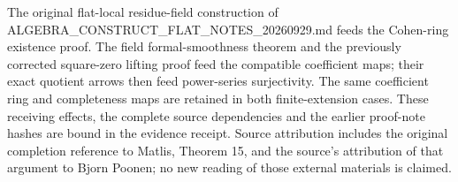 The original flat-local residue-field construction of ALGEBRA\_\allowbreak{}CONSTRUCT\_\allowbreak{}FLAT\_\allowbreak{}NOTES\_\allowbreak{}20260929.\allowbreak{}md feeds the Cohen-ring existence proof. The field formal-smoothness theorem and the previously corrected square-zero lifting proof feed the compatible coefficient maps; their exact quotient arrows then feed power-series surjectivity. The same coefficient ring and completeness maps are retained in both finite-extension cases. These receiving effects, the complete source dependencies and the earlier proof-note hashes are bound in the evidence receipt. Source attribution includes the original completion reference to Matlis, Theorem 15, and the source's attribution of that argument to Bjorn Poonen; no new reading of those external materials is claimed.
